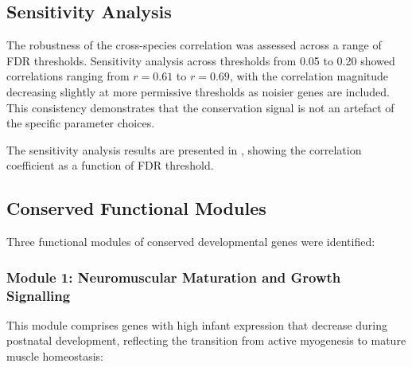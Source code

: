 \subsection{Sensitivity Analysis}

The robustness of the cross-species correlation was assessed across a range of FDR thresholds. Sensitivity analysis across thresholds from 0.05 to 0.20 showed correlations ranging from $r = 0.61$ to $r = 0.69$, with the correlation magnitude decreasing slightly at more permissive thresholds as noisier genes are included. This consistency demonstrates that the conservation signal is not an artefact of the specific parameter choices.

The sensitivity analysis results are presented in , showing the correlation coefficient as a function of FDR threshold.

\subsection{Conserved Functional Modules}

Three functional modules of conserved developmental genes were identified:

\subsubsection{Module 1: Neuromuscular Maturation and Growth Signalling}

This module comprises genes with high infant expression that decrease during postnatal development, reflecting the transition from active myogenesis to mature muscle homeostasis:

